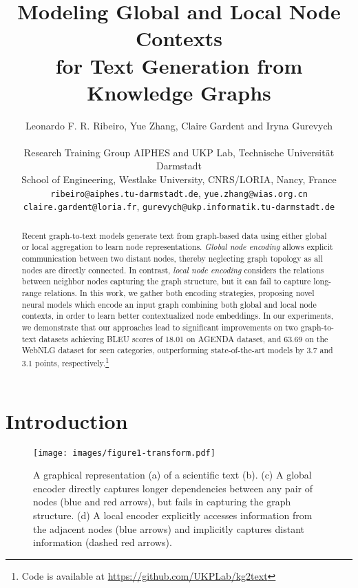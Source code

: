 \documentclass[11pt,a4paper]{article}
\title{Modeling Global and Local Node Contexts \\ for Text Generation from Knowledge Graphs}
\author{Leonardo F. R. Ribeiro, Yue Zhang, Claire Gardent and Iryna Gurevych \vspace{1mm} \\
\rule{0pt}{2.5ex}
  Research Training Group AIPHES and UKP Lab, Technische Universit\"at Darmstadt\\
  School of Engineering, Westlake University, CNRS/LORIA, Nancy, France \\
 \texttt{ribeiro@aiphes.tu-darmstadt.de}, \texttt{yue.zhang@wias.org.cn} \\
 \texttt{claire.gardent@loria.fr}, \texttt{gurevych@ukp.informatik.tu-darmstadt.de}
}
\date{}
\begin{document}
\maketitle
\begin{abstract}
  Recent graph-to-text models generate text from graph-based data using either global or local aggregation to learn node representations. \emph{Global node encoding} allows explicit communication between two distant nodes, thereby neglecting graph topology as all nodes are directly connected. In contrast, \emph{local node encoding} considers the relations between neighbor nodes capturing the graph structure, but it can fail to capture long-range relations. In this work, we gather both encoding strategies, proposing novel neural models which encode an input graph combining both global and local node contexts, in order to learn better contextualized node embeddings. In our experiments, we demonstrate that our approaches lead to significant improvements on two graph-to-text datasets achieving BLEU scores of 18.01 on AGENDA dataset, and 63.69 on the WebNLG dataset for seen categories, outperforming state-of-the-art models by 3.7 and 3.1 points, respectively.\footnote{Code is available at \href{https://github.com/UKPLab/kg2text}{https://github.com/UKPLab/kg2text}}
  


  
\end{abstract}

\section{Introduction}










\begin{figure}[t]
    \centering
    \texttt{[image: images/figure1-transform.pdf]}
    \caption{A graphical representation (a) of a scientific text (b). (c) A global encoder directly captures longer dependencies between any pair of nodes (blue and red arrows), but fails in capturing the graph structure. (d) A local encoder explicitly accesses information from the adjacent nodes (blue arrows) and implicitly captures distant information (dashed red arrows). }
    \label{fig:kg}
\end{figure}
\end{document}
